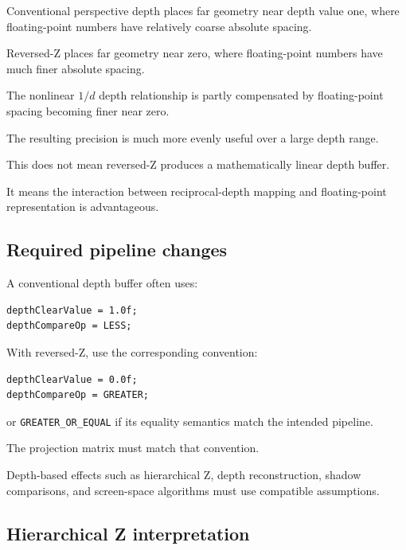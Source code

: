 \hypertarget{02-foundations-ii-ch033-why-floating-point-reversed-z-works}{}

Conventional perspective depth places far geometry near depth value one, where floating-point numbers have relatively coarse absolute spacing.

Reversed-Z places far geometry near zero, where floating-point numbers have much finer absolute spacing.

The nonlinear \(1/d\) depth relationship is partly compensated by floating-point spacing becoming finer near zero.

The resulting precision is much more evenly useful over a large depth range.

This does not mean reversed-Z produces a mathematically linear depth buffer.

It means the interaction between reciprocal-depth mapping and floating-point representation is advantageous.

\subsection{Required pipeline changes}\label{02-foundations-ii-ch033-required-pipeline-changes}

\hypertarget{02-foundations-ii-ch033-required-pipeline-changes}{}

A conventional depth buffer often uses:

\begin{verbatim}
depthClearValue = 1.0f;
depthCompareOp = LESS;
\end{verbatim}

With reversed-Z, use the corresponding convention:

\begin{verbatim}
depthClearValue = 0.0f;
depthCompareOp = GREATER;
\end{verbatim}

or \texttt{GREATER\_OR\_EQUAL} if its equality semantics match the intended pipeline.

The projection matrix must match that convention.

Depth-based effects such as hierarchical Z, depth reconstruction, shadow comparisons, and screen-space algorithms must use compatible assumptions.

\subsection{Hierarchical Z interpretation}\label{02-foundations-ii-ch033-hierarchical-z-interpretation}

